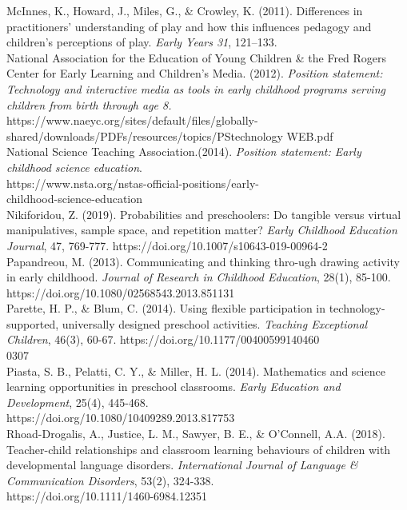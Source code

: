\documentclass[11.5pt]{sig-alternate}
\begin{document}
McInnes, K., Howard, J., Miles, G., \& Crowley, K. (2011). Differences in practitioners’ 
understanding of play and how this influences pedagogy and children’s perceptions of play. \textit{Early Years 31}, 121–133.
\\

National Association for the Education of Young Children \& the Fred Rogers Center for Early 
Learning and Children’s Media. (2012). \textit{Position statement: Technology and interactive media as tools in early childhood programs serving children from birth through age 8. }\\
https://www.naeyc.org/sites/default/files/globally-\\shared/downloads/PDFs/resources/topics/PS\textunderscore technology \textunderscore WEB.pdf
\\
\newpage
National Science Teaching Association.(2014).\textit{ Position statement: Early childhood science education}. \\https://www.nsta.org/nstas-official-positions/early-\\childhood-science-education
\\

Nikiforidou, Z. (2019). Probabilities and preschoolers: Do tangible versus virtual manipulatives, 
sample space, and repetition matter? \textit{Early Childhood Education Journal}, 47, 769-777. https://doi.org/10.1007/s10643-019-00964-2 
\\

Papandreou, M. (2013). Communicating and thinking thro-ugh drawing activity in early 
childhood. \textit{Journal of Research in Childhood Education}, 28(1), 85-100.\\ https://doi.org/10.1080/02568543.2013.851131
\\

Parette, H. P., \& Blum, C. (2014). Using flexible participation in technology-supported, 
universally designed preschool activities. \textit{Teaching Exceptional Children}, 46(3), 60-67. https://doi.org/10.1177/00400599140460\\0307 
\\

Piasta, S. B., Pelatti, C. Y., \& Miller, H. L. (2014). Mathematics and science learning 
opportunities in preschool classrooms. \textit{Early Education and Development}, 25(4), 445-468. \\https://doi.org/10.1080/10409289.2013.817753
\\

Rhoad-Drogalis, A., Justice, L. M., Sawyer, B. E., \& O’Connell, A.A. (2018). Teacher-child 
relationships and classroom learning behaviours of children with developmental language disorders. \textit{International Journal of Language \& Communication Disorders}, 53(2), 324-338. \\https://doi.org/10.1111/1460-6984.12351 
\\
\end{document}
